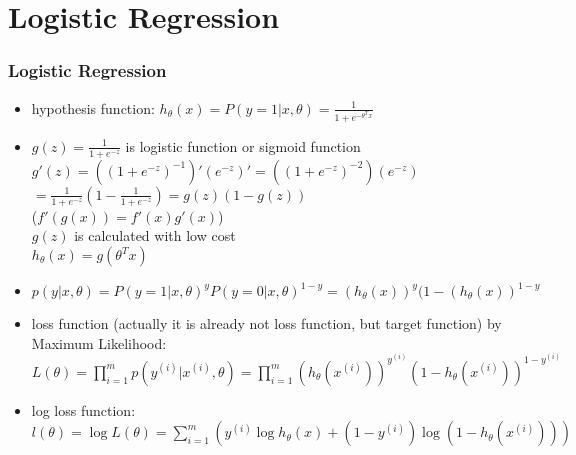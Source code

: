 
\ifx\allfiles\undefined

\fi
\section{Logistic Regression}
\begin{frame}
\frametitle{Logistic Regression}
	\small
	\begin{itemize}
		\item hypothesis function: $h_{\theta}(x)=P(y=1|x,\theta)=\frac{1}{1+e^{-\theta ^T x}}$
		\item $g(z)=\frac{1}{1+e^{-z}}$ is logistic function or sigmoid function\\
		      $g'(z)=((1+e^{-z})^{-1})'(e^{-z})'=((1+e^{-z})^{-2})(e^{-z})$\\
		     \hspace{0.8cm} $=\frac{1}{1+e^{-z}}(1-\frac{1}{1+e^{-z}})=g(z)(1-g(z))$\\
		     \hspace{0.8cm}($f'(g(x))=f'(x)g'(x)$)\\
		     \hspace{0.8cm}$g(z)$ is calculated with low cost\\
		     $h_{\theta}(x)=g(\theta ^T x)$ 
		\item $p(y|x,\theta)=P(y=1|x,\theta)^yP(y=0|x,\theta)^{1-y}=(h_{\theta}(x))^y(1-(h_{\theta}(x))^{1-y}$
		\item loss function (actually it is already not loss function, but target function) by Maximum Likelihood: \\
			$L(\theta)=\prod_{i=1}^{m}p(y^{(i)}|x^{(i)},\theta)=\prod_{i=1}^{m}(h_{\theta}(x^{(i)}))^{y^{(i)}}(1-h_{\theta}(x^{(i)}))^{1-y^{(i)}}$
		\item log loss function:\\
			$l(\theta)=\log L(\theta)=\sum_{i=1}^{m}(y^{(i)}\log h_{\theta}(x)+{(1-y^{(i)})}\log (1-h_{\theta}(x^{(i)})))$
	\end{itemize}
\end{frame}
